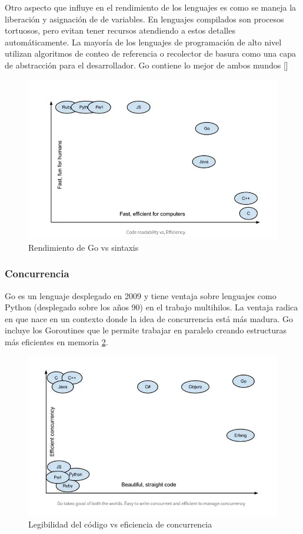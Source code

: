 Otro aspecto que influye en el rendimiento de los lenguajes es como se maneja la liberación y asignación de de variables. En lenguajes compilados son procesos tortuosos, pero evitan tener recursos atendiendo a estos detalles automáticamente. La mayoría de los lenguajes de programación de alto nivel utilizan algoritmos de conteo de referencia o recolector de basura como una capa de abstracción para el desarrollador. Go contiene lo mejor de ambos mundos [\cite{whygo}]

\begin{figure}[h]
	\includegraphics[width=\linewidth]{Graphics/go_rend.png}
	\caption{Rendimiento de Go vs sintaxis}
	\label{fig:6}
\end{figure} 


\subsubsection{Concurrencia}
Go es un lenguaje desplegado en 2009 y tiene ventaja sobre lenguajes como Python (desplegado sobre los años 90) en el trabajo multihilos. La ventaja radica en que nace en un contexto donde la idea de concurrencia está más madura. Go incluye los Goroutines que le permite trabajar en paralelo creando estructuras más eficientes en memoria \ref{fig:7}. 

\begin{figure}[h]
	\includegraphics[width=\linewidth]{Graphics/go_concurr.png}
	\caption{Legibilidad del código vs eficiencia de concurrencia}
	\label{fig:7}
\end{figure} 

